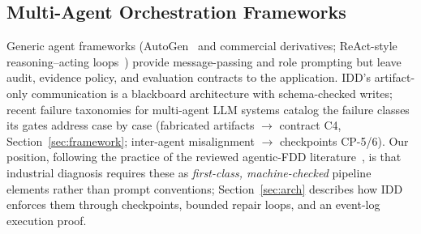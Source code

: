 \documentclass[preprint,12pt]{elsarticle}
\begin{document}
\begin{table}[!t]
\caption{Positioning against the closest published systems. Each row scores a published or contemporaneous system on real time-series input, scenario-level root-cause analysis, an evidence trail, cap-enforced confidence, and a reproducibility gate; IDD is the only system that combines all five. ``Repro.\ gate'' rates whether the system's evaluation is machine-replayed end to end (IDD: internal to our own harness; the trust boundary it operates under is consolidated in Section~\ref{sec:discussion}); PCA/deep FDD baselines are ``partial'' because detection rates are reproducible but diagnosis claims are not. AgentRCA is a contemporaneous non-peer-reviewed preprint.}
\label{tab:related}
\centering
\footnotesize
{}
\end{table}

\subsection{Multi-Agent Orchestration Frameworks}
Generic agent frameworks (AutoGen~\cite{wu2023autogen} and commercial derivatives; ReAct-style reasoning--acting loops~\cite{yao2023react}) provide message-passing and role prompting but leave audit, evidence policy, and evaluation contracts to the application. IDD's artifact-only communication is a blackboard architecture with schema-checked writes; recent failure taxonomies for multi-agent LLM systems \cite{cemri2025mast} catalog the failure classes its gates address case by case (fabricated artifacts $\to$ contract C4, Section~\ref{sec:framework}; inter-agent misalignment $\to$ checkpoints CP-5/6). Our position, following the practice of the reviewed agentic-FDD literature~\cite{agentic2026review}, is that industrial diagnosis requires these as \emph{first-class, machine-checked} pipeline elements rather than prompt conventions; Section~\ref{sec:arch} describes how IDD enforces them through checkpoints, bounded repair loops, and an event-log execution proof.
\end{document}

